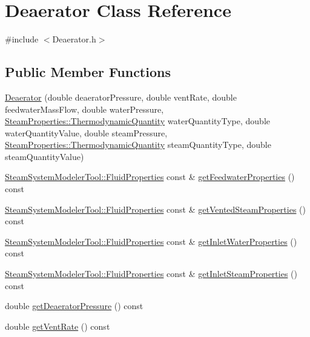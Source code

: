 \hypertarget{class_deaerator}{}\section{Deaerator Class Reference}
\label{class_deaerator}


{\ttfamily \#include $<$Deaerator.\+h$>$}

\subsection*{Public Member Functions}
\begin{DoxyCompactItemize}
\item 
\hyperlink{class_deaerator_a02311c34cbe46384187292e5f844984c}{Deaerator} (double deaerator\+Pressure, double vent\+Rate, double feedwater\+Mass\+Flow, double water\+Pressure, \hyperlink{class_steam_properties_ae0294bedf7d178c2d8fb6aed0f62fbff}{Steam\+Properties\+::\+Thermodynamic\+Quantity} water\+Quantity\+Type, double water\+Quantity\+Value, double steam\+Pressure, \hyperlink{class_steam_properties_ae0294bedf7d178c2d8fb6aed0f62fbff}{Steam\+Properties\+::\+Thermodynamic\+Quantity} steam\+Quantity\+Type, double steam\+Quantity\+Value)
\item 
\hyperlink{struct_steam_system_modeler_tool_1_1_fluid_properties}{Steam\+System\+Modeler\+Tool\+::\+Fluid\+Properties} const  \& \hyperlink{class_deaerator_ab2ab900e36c86e48ad92c4013c471d6b}{get\+Feedwater\+Properties} () const
\item 
\hyperlink{struct_steam_system_modeler_tool_1_1_fluid_properties}{Steam\+System\+Modeler\+Tool\+::\+Fluid\+Properties} const  \& \hyperlink{class_deaerator_a576a4632452268f77839334d87d5abff}{get\+Vented\+Steam\+Properties} () const
\item 
\hyperlink{struct_steam_system_modeler_tool_1_1_fluid_properties}{Steam\+System\+Modeler\+Tool\+::\+Fluid\+Properties} const  \& \hyperlink{class_deaerator_a9138c93cf6643e91ad7ce0de7fb328b7}{get\+Inlet\+Water\+Properties} () const
\item 
\hyperlink{struct_steam_system_modeler_tool_1_1_fluid_properties}{Steam\+System\+Modeler\+Tool\+::\+Fluid\+Properties} const  \& \hyperlink{class_deaerator_a7298fa1e4930e73dd5340411e8ccff33}{get\+Inlet\+Steam\+Properties} () const
\item 
double \hyperlink{class_deaerator_ac16cacdeef74e45f951fe992bac4e9e3}{get\+Deaerator\+Pressure} () const
\item 
double \hyperlink{class_deaerator_ad0262491c2bd9a6f820eaaba54498bcd}{get\+Vent\+Rate} () const

\end{DoxyCompactItemize}
